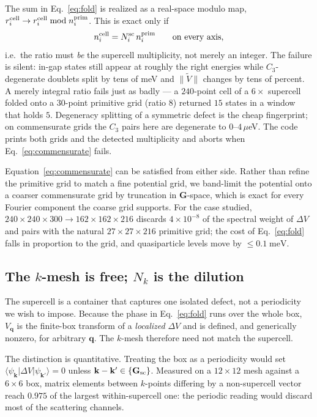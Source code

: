 \documentclass[aps,prx,reprint,superscriptaddress,nofootinbib,longbibliography]{revtex4-2}
\newcommand{\dV}{\Delta V}
\newcommand{\Vt}{\widetilde{V}}
\newcommand{\kk}{\mathbf{k}}
\newcommand{\qq}{\mathbf{q}}
\newcommand{\GG}{\mathbf{G}}
\newcommand{\meV}{\;\mathrm{meV}}
\begin{document}
The sum in Eq.~\eqref{eq:fold} is realized as a real-space modulo map,
$r^{\rm cell}_i \to r^{\rm cell}_i \bmod n^{\rm prim}_i$. This is exact only if
\begin{equation}
  n^{\rm cell}_i = N^{\rm sc}_i \, n^{\rm prim}_i
  \qquad \text{on every axis,}
  \label{eq:commensurate}
\end{equation}
i.e.\ the ratio must \emph{be} the supercell multiplicity, not merely an
integer. The failure is silent: in-gap states still appear at roughly the right
energies while $C_3$-degenerate doublets split by tens of meV and
$\lVert \Vt \rVert$ changes by tens of percent. A merely integral ratio fails
just as badly --- a $240$-point cell of a $6\times$ supercell folded onto a
$30$-point primitive grid (ratio $8$) returned $15$ states in a window that
holds $5$. Degeneracy splitting of a symmetric defect is the cheap
fingerprint; on commensurate grids the $C_3$ pairs here are degenerate to
$0$--$4\,\mu$eV. The code prints both grids and the detected multiplicity and
aborts when Eq.~\eqref{eq:commensurate} fails.

Equation~\eqref{eq:commensurate} can be satisfied from either side. Rather than
refine the primitive grid to match a fine potential grid, we band-limit the
potential onto a coarser commensurate grid by truncation in $\GG$-space, which
is exact for every Fourier component the coarse grid supports. For the case
studied, $240\times240\times300 \to 162\times162\times216$ discards
$4\times10^{-8}$ of the spectral weight of $\dV$ and pairs with the natural
$27\times27\times216$ primitive grid; the cost of Eq.~\eqref{eq:fold} falls in
proportion to the grid, and quasiparticle levels move by $\le 0.1\meV$.

\subsection{The $k$-mesh is free; $N_k$ is the dilution}
\label{sec:freegrid}

The supercell is a container that captures one isolated defect, not a
periodicity we wish to impose. Because the phase in Eq.~\eqref{eq:fold} runs
over the whole box, $V_\qq$ is the finite-box transform of a \emph{localized}
$\dV$ and is defined, and generically nonzero, for arbitrary $\qq$. The
$k$-mesh therefore need not match the supercell.

The distinction is quantitative. Treating the box as a periodicity would set
$\langle \psi_\kk | \dV | \psi_{\kk'} \rangle = 0$ unless
$\kk - \kk' \in \{\GG_{\rm sc}\}$. Measured on a $12\times12$ mesh against a
$6\times6$ box, matrix elements between $k$-points differing by a
non-supercell vector reach $0.975$ of the largest within-supercell one: the
periodic reading would discard most of the scattering channels.
\end{document}
